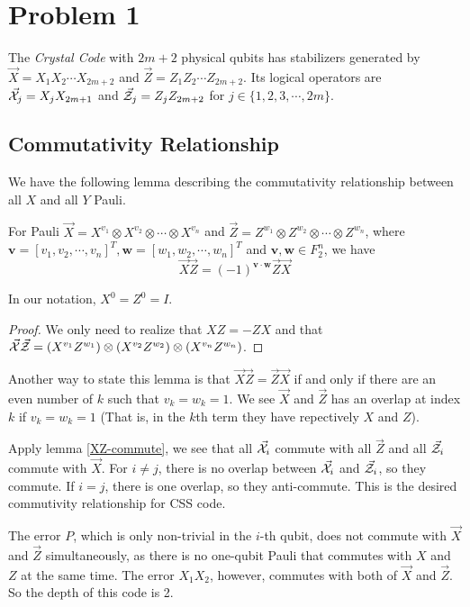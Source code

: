 \section{Problem 1}

The \textit{Crystal Code} with $2m + 2$ physical qubits has stabilizers generated by $\vec{X}= X_1 X_2 \cdots X_{2m + 2}$ and $\vec{Z} = Z_1 Z_2 \cdots Z_{2m + 2}$.
Its logical operators are $\vec{\mathcal{X}}_j = X_j X_{2m+1}$ and $\vec{\mathcal{Z}}_j = Z_j Z_{2m+2}$ for $j \in \{1, 2, 3, \cdots, 2m\}$.

\subsection{Commutativity Relationship}

We have the following lemma describing the commutativity relationship between all $X$ and all $Y$ Pauli.

\begin{lemma}\label{XZ-commute}
	For Pauli $\vec{X} = X^{v_1}\otimes X^{v_2} \otimes \cdots \otimes X^{v_n}$ and $\vec{Z} = Z^{w_1}\otimes Z^{w_2} \otimes \cdots \otimes Z^{w_n}$,
	where $\bm{v} = [v_1, v_2, \cdots, v_n]^T, \bm{w} = [w_1, w_2, \cdots, w_n]^T$ and $\bm{v}, \bm{w} \in F_2^n$, we have 
	$$
	\vec{X} \vec{Z} = (-1)^{\bm{v} \cdot \bm{w}} \vec{Z} \vec{X}
	$$

	In our notation, $X^0 = Z^0 = I$.
\end{lemma}

\begin{proof}
	We only need to realize that $XZ = -ZX$ and that $\vec{\mathcal{X}} \vec{\mathcal{Z}} = (X^{v_1}Z^{w_1}) \otimes (X^{v_2}Z^{w_2}) \otimes (X^{v_n}Z^{w_n})$.
\end{proof}

Another way to state this lemma is that $\vec{X} \vec{Z} = \vec{Z} \vec{X}$ if and only if there are an even number of $k$ such that $v_k = w_k = 1$.
We see $\vec{X}$ and $\vec{Z}$ has an overlap at index $k$ if $v_k = w_k = 1$ (That is, in the $k$th term they have repectively $X$ and $Z$).


Apply lemma \ref{XZ-commute}, we see that all $\vec{\mathcal{X}}_i$ commute with all $\vec{Z}$ and all $\vec{\mathcal{Z}}_i$ commute with $\vec{X}$.
For $i \neq j$, there is no overlap between $\vec{\mathcal{X}}_i$ and $\vec{\mathcal{Z}}_i$, so they commute. If $i = j$, there is one overlap, so they anti-commute.
This is the desired commutivity relationship for CSS code.

The error $P$, which is only non-trivial in the $i$-th qubit, does not commute with $\vec{X}$ and $\vec{Z}$ simultaneously, as there is no one-qubit Pauli that commutes with $X$ and $Z$ at the same time.
The error $X_1X_2$, however, commutes with both of $\vec{X}$ and $\vec{Z}$.
So the depth of this code is 2.

